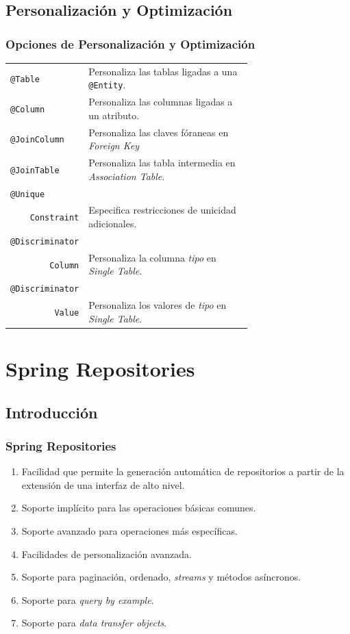 \documentclass[a4paper,slidestop,xcolor=pst,blue]{beamer}
\newcommand{\ann}[1]{\color{blue}\texttt{#1}\color{black}}
\begin{document}
\subsection{Personalización y Optimización}

\begin{frame}[c]
    \frametitle{Opciones de Personalización y Optimización}
    \begin{tabular}{lp{0.70\linewidth}}
        \ann{@Table}      & Personaliza las tablas ligadas a una \ann{@Entity}. \\
        \ann{@Column}     & Personaliza las columnas ligadas a un atributo. \\
        \ann{@JoinColumn} & Personaliza las claves fóraneas en \emph{Foreign Key} \\
        \ann{@JoinTable } & Personaliza las tabla intermedia en \emph{Association Table}. \\
        \ann{@Unique}     & \\
        \multicolumn{1}{r}{\ann{Constraint}} & Especifica restricciones de unicidad adicionales. \\
        \ann{@Discriminator} &  \\
        \multicolumn{1}{r}{\ann{Column}} & Personaliza la columna \emph{tipo} en \emph{Single Table}. \\
        \ann{@Discriminator} &  \\
        \multicolumn{1}{r}{\ann{Value}} & Personaliza los valores de \emph{tipo} en \emph{Single Table}. \\
    \end{tabular}
\end{frame}

\section{Spring Repositories}

\subsection{Introducción}

\begin{frame}[c]
    \frametitle{Spring Repositories}
    \begin{enumerate}[<+->]
        \item Facilidad que permite la generación automática de repositorios a partir de la extensión de una interfaz de alto nivel.
        \item Soporte implícito para las operaciones básicas comunes.
        \item Soporte avanzado para operaciones más específicas.
        \item Facilidades de personalización avanzada.
        \item Soporte para paginación, ordenado, \emph{streams} y métodos asíncronos.
        \item Soporte para \emph{query by example}.
        \item Soporte para \emph{data transfer objects}.
    \end{enumerate}
\end{frame}
\end{document}
